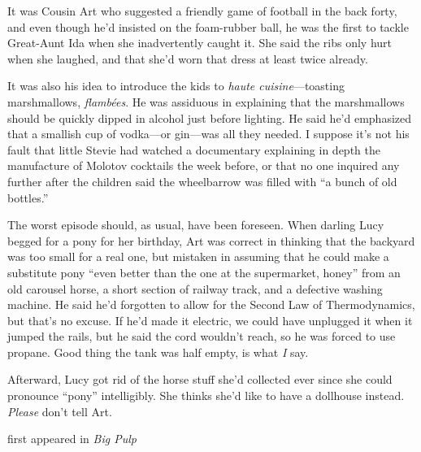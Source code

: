It was Cousin Art who suggested a friendly game of football in the back
forty, and even though he'd insisted on the foam-rubber ball, he was the
first to tackle Great-Aunt Ida when she inadvertently caught it. She
said the ribs only hurt when she laughed, and that she'd worn that dress
at least twice already.

It was also his idea to introduce the kids to \emph{haute
cuisine}---toasting marshmallows, \emph{flambées}. He was assiduous in
explaining that the marshmallows should be quickly dipped in alcohol
just before lighting. He said he'd emphasized that a smallish cup of
vodka---or gin---was all they needed. I suppose it's not his fault that
little Stevie had watched a documentary explaining in depth the
manufacture of Molotov cocktails the week before, or that no one
inquired any further after the children said the wheelbarrow was filled
with ``a bunch of old bottles.''

The worst episode should, as usual, have been foreseen. When darling
Lucy begged for a pony for her birthday, Art was correct in thinking
that the backyard was too small for a real one, but mistaken in assuming
that he could make a substitute pony ``even better than the one at the
supermarket, honey'' from an old carousel horse, a short section of
railway track, and a defective washing machine. He said he'd forgotten
to allow for the Second Law of Thermodynamics, but that's no excuse. If
he'd made it electric, we could have unplugged it when it jumped the
rails, but he said the cord wouldn't reach, so he was forced to use
propane. Good thing the tank was half empty, is what \emph{I} say.

Afterward, Lucy got rid of the horse stuff she'd collected ever since
she could pronounce ``pony'' intelligibly. She thinks she'd like to have
a dollhouse instead. \emph{Please} don't tell Art.

first appeared in \emph{Big Pulp}
